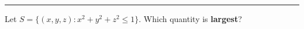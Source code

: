 \documentclass{ximera}
\begin{document}
\hrule

\begin{problem}
  Let $S = \{(x,y,z): x^2 +y^2 + z^2 \le 1\}$. Which quantity is \textbf{largest}?
  \begin{multipleChoice}
      \pdfOnly{\end{multicols}}
    \end{multipleChoice}
\end{problem}
\end{document}
